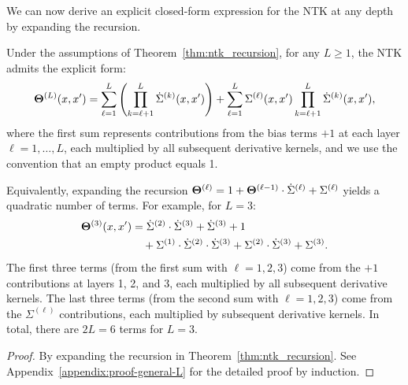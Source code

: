 \vspace{0.4cm}
We can now derive an explicit closed-form expression for the NTK at any depth by expanding the recursion.

\begin{corollary}\label{cor:general_L_layer_ntk}
Under the assumptions of Theorem~\ref{thm:ntk_recursion}, for any \( L\ge1 \), the NTK admits the explicit form:
\begin{equation}
\label{eq:ntk_explicit_form}
\boldsymbol{\Theta}^{(L)}(x,x') = \sum_{\ell=1}^{L} \left(\prod_{k=\ell+1}^{L} \dot{\Sigma}^{(k)}(x,x')\right) + \sum_{\ell=1}^{L} \Sigma^{(\ell)}(x,x') \prod_{k=\ell+1}^{L} \dot{\Sigma}^{(k)}(x,x'),
\end{equation}
where the first sum represents contributions from the bias terms \( +1 \) at each layer \( \ell=1,\dots,L \), each multiplied by all subsequent derivative kernels, and we use the convention that an empty product equals 1.
\end{corollary}

\begin{remark}
Equivalently, expanding the recursion \( \boldsymbol{\Theta}^{(\ell)} = 1 + \boldsymbol{\Theta}^{(\ell-1)}\cdot\dot{\Sigma}^{(\ell)} + \Sigma^{(\ell)} \) yields a quadratic number of terms. For example, for \( L=3 \):
\begin{align}
\boldsymbol{\Theta}^{(3)}(x,x') &= \dot{\Sigma}^{(2)}\cdot\dot{\Sigma}^{(3)} + \dot{\Sigma}^{(3)} + 1 \nonumber\\
&\quad + \Sigma^{(1)}\cdot\dot{\Sigma}^{(2)}\cdot\dot{\Sigma}^{(3)} + \Sigma^{(2)}\cdot\dot{\Sigma}^{(3)} + \Sigma^{(3)}.
\end{align}
The first three terms (from the first sum with \( \ell=1,2,3 \)) come from the \( +1 \) contributions at layers 1, 2, and 3, each multiplied by all subsequent derivative kernels. The last three terms (from the second sum with \( \ell=1,2,3 \)) come from the \( \Sigma^{(\ell)} \) contributions, each multiplied by subsequent derivative kernels. In total, there are \( 2L = 6 \) terms for \( L=3 \).
\end{remark}

\begin{proof}
\label{proof:general_L_ntk_inline}
By expanding the recursion in Theorem~\ref{thm:ntk_recursion}. See Appendix~\ref{appendix:proof-general-L} for the detailed proof by induction.
\end{proof}

\vspace{0.3cm}
